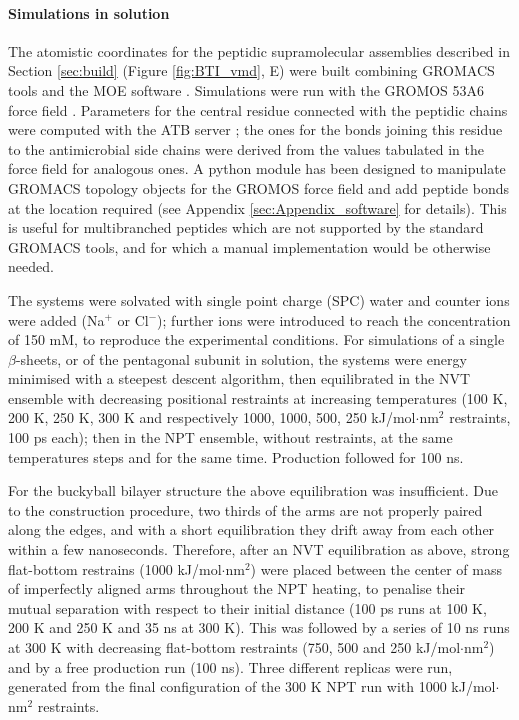 \paragraph{Simulations in solution} The atomistic coordinates for the peptidic supramolecular assemblies described in Section \ref{sec:build} (Figure \ref{fig:BTI_vmd}, E) were built combining GROMACS tools and the MOE software \citep{moe}.
%
Simulations were run with the GROMOS 53A6 force field \citep{Oostenbrink2004}. Parameters for the central residue connected with the peptidic chains were computed with the ATB server \citep{Malde2011, Koziara2014}; the ones for the bonds joining this residue to the antimicrobial side chains were derived from the values tabulated in the force field for analogous ones.
%
A python module has been designed to manipulate GROMACS topology objects for the GROMOS force field and add peptide bonds at the location required (see Appendix \ref{sec:Appendix_software} for details). This is useful for multibranched peptides which are not supported by the standard GROMACS tools, and for which a manual implementation would be otherwise needed.

The systems were solvated with single point charge (SPC) water \citep{Berendsen1981} and counter ions were added (Na$^+$ or Cl$^-$); further ions were introduced to reach the concentration of 150 mM, to reproduce the experimental conditions.
%
For simulations of a single $\beta$-sheets, or of the pentagonal subunit in solution, the systems were energy minimised with a steepest descent algorithm, then equilibrated in the NVT ensemble with decreasing positional restraints at increasing temperatures (100 K, 200 K, 250 K, 300 K and respectively 1000, 1000, 500, 250 kJ/mol$\cdot$nm$^2$ restraints, 100 ps each); then in the NPT ensemble, without restraints, at the same temperatures steps and for the same time. Production followed for 100 ns.

For the buckyball bilayer structure the above equilibration was insufficient. Due to the construction procedure, two thirds of the arms are not properly paired along the edges, and with a short equilibration they drift away from each other within a few nanoseconds.
%
Therefore, after an NVT equilibration as above, strong flat-bottom restrains (1000 kJ/mol$\cdot$nm$^2$) were placed between the center of mass of imperfectly aligned arms throughout the NPT heating, to penalise their mutual separation with respect to their initial distance (100 ps runs at 100 K, 200 K and 250 K and 35 ns at 300 K).
%
This was followed by a series of 10 ns runs at 300 K with decreasing flat-bottom restraints (750, 500 and 250 kJ/mol$\cdot$nm$^2$) and by a free production run (100 ns).
%
Three different replicas were run, generated from the final configuration of the 300 K NPT run with 1000 kJ/mol$\cdot$nm$^2$ restraints.


